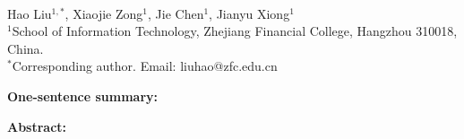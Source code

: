 

\linenumbers
\begin{center}
{\Large\bfseries \papertitle}\\[10pt]
{\normalsize Hao Liu$^{1,*}$, Xiaojie Zong$^{1}$, Jie Chen$^{1}$, Jianyu Xiong$^{1}$}\\[6pt]
{\small $^{1}$School of Information Technology, Zhejiang Financial College, Hangzhou 310018, China.}\\
{\small $^{*}$Corresponding author. Email: liuhao@zfc.edu.cn}
\end{center}
\vspace{4pt}
\noindent\textbf{One-sentence summary:} \onesentence
\vspace{6pt}

\noindent\textbf{Abstract:} 
\vspace{6pt}






\clearpage


